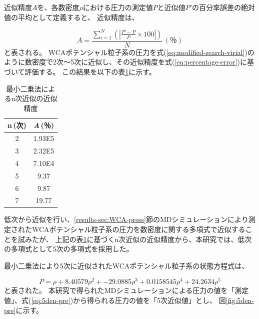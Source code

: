 \documentclass[titlepage]{jsreport}
\begin{document}
{{{近似精度$A$を、各数密度$\rho$における圧力の測定値$P$と近似値$P'$の百分率誤差の絶対値の平均として定義すると、
近似精度は、

\large
\begin{equation}
    A=\frac{\sum_{i=1}^N\left(|\frac{P'-P}{P}\times100|\right)}{N}\,(％)\label{eq:percentage-error}
\end{equation}
\normalsize
と表される。
WCAポテンシャル粒子系の圧力を式(\ref{eq:modified-search-virial})のように数密度で2次〜5次に近似し、その近似精度を式(\ref{eq:percentage-error})に基づいて評価する。
この結果を以下の表\ref{table:approximation-accuracy}に示す。

\begin{table}[htbp]
    \begin{center}
        \caption{最小二乗法によるn次近似の近似精度}
        \label{table:approximation-accuracy}
            \begin{tabular}{c c}
                    n\,(次) & {\it{A}}\,(％) \\ \hline\hline
                    2 & 1.93E5 \\ 
                    3 & 2.32E5 \\ 
                    4 & 7.10E4\\ 
                    5 & 9.37\\ 
                    6 & 9.87 \\ 
                    7 & 19.77 \\ \hline
                
            \end{tabular}
    \end{center}
    
\end{table}

\newpage
低次から近似を行い、\ref{results-sec:WCA-press}節のMDシミュレーションにより測定されたWCAポテンシャル粒子系の圧力を数密度に関する多項式で近似することを試みたが、
上記の表\ref{table:approximation-accuracy}に基づくn次近似の近似精度から、本研究では、低次の多項式として5次の多項式を採用した。

最小二乗法により5次に近似されたWCAポテンシャル粒子系の状態方程式は、

\large
\begin{equation}
    P=\rho+8.40579\rho^2+-29.0885\rho^3+0.0158545\rho^4+24.2634\rho^5 \label{eq:5den-pre}
\end{equation}
\normalsize
と表された。
本研究で得られたMDシミュレーションによる圧力の値を「測定値」、式(\ref{eq:5den-pre})から得られる圧力の値を「5次近似値」とし、
図\ref{fig:5den-pre}に示す。

}}}
\end{document}
